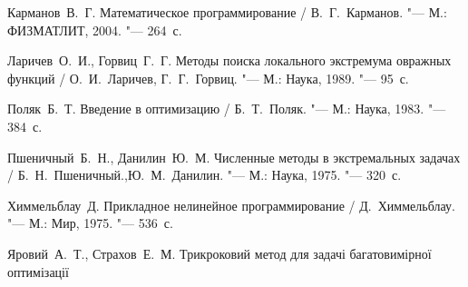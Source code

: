 \begin{thebibliography}{99}

Карманов~В.~Г. Математическое программирование / В.~Г.~Карманов. "--- М.: ФИЗМАТЛИТ, 2004. "--- 264~с.

Ларичев~О.~И., Горвиц~Г.~Г. Методы поиска локального экстремума овражных функций /
О.~И.~Ларичев, Г.~Г.~Горвиц.  "--- М.: Наука, 1989. "--- 95~с.

Поляк~Б.~Т. Введение в оптимизацию / Б.~Т.~Поляк. "--- М.: Наука, 1983. "--- 384~с.

Пшеничный~Б.~Н., Данилин~Ю.~М. Численные методы в экстремальных задачах / Б.~Н.~Пшеничный.,Ю.~М.~Данилин. "--- М.: Наука, 1975. "--- 320~с.

Химмельблау~Д. Прикладное нелинейное программирование / Д.~Химмельблау. "--- М.: Мир, 1975. "--- 536~с.

Яровий~А.~Т., Страхов~Е.~М. Трикроковий метод для задачі багатовимірної оптимізації

\end{thebibliography}
